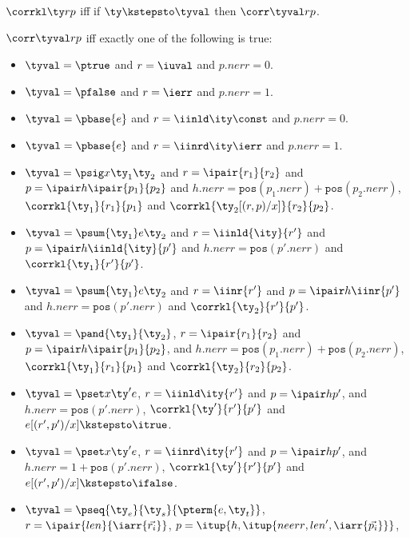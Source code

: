 \begin{definition}
$\corrkl \ty r p$ iff if $\ty \kstepsto \tyval$ then $\corr \tyval r p$.
\end{definition}

\begin{definition}
$\corr \tyval r p$ iff exactly one of the following is true:
  \begin{itemize}
  \item $\tyval = \ptrue$ and $r = \iuval$ and $p.{nerr} = 0$.
  \item $\tyval = \pfalse$ and $r = \ierr$ and $p.{nerr} = 1$.
  \item $\tyval = \pbase{e}$ and $r = \iinld \ity \const$ and $p.{nerr} = 0$.
  \item $\tyval = \pbase{e}$ and $r = \iinrd \ity \ierr$ and $p.{nerr} = 1$.
  \item $\tyval = \psig x {\ty_1} {\ty_2}$ and $r =\ipair {r_1} {r_2}$ and $p =
    \ipair h {\ipair {p_1} {p_2}}$ 
    and $h.{nerr} = \mathtt{pos}(p_1.{nerr}) + \mathtt{pos}(p_2.{nerr})$, $\corrkl
    {\ty_1} {r_1} {p_1}$ and $\corrkl {\ty_2[(r,p)/x]} {r_2} {p_2}$.
  \item $\tyval = \psum {\ty_1} e {\ty_2}$ and $r =\iinld {\ity}{r'}$
    and $p = \ipair h {\iinld {\ity}{p'}}$
    and $h.{nerr} = \mathtt{pos}(p'.{nerr})$ and $\corrkl
    {\ty_1} {r'} {p'}$.
  \item $\tyval = \psum {\ty_1} e {\ty_2}$ and $r =\iinr {r'}$
    and $p = \ipair h {\iinr {p'}}$
    and $h.{nerr} = \mathtt{pos}(p'.{nerr})$ and $\corrkl
    {\ty_2} {r'} {p'}$.
  \item $\tyval = \pand {\ty_1} {\ty_2}$, $r = \ipair {r_1} {r_2}$ and $p =
    \ipair h {\ipair {p_1}{p_2}}$, 
    and $h.{nerr} = \mathtt{pos}(p_1.{nerr}) + \mathtt{pos}(p_2.{nerr})$, 
    $\corrkl {\ty_1} {r_1} {p_1}$ and $\corrkl {\ty_2} {r_2} {p_2}$.
  \item $\tyval = \pset x {\ty'} e$, $r = \iinld \ity {r'}$ and $p =
    \ipair h {p'}$, 
    and $h.{nerr} = \mathtt{pos}(p'.{nerr})$, $\corrkl {\ty'}{r'}{p'}$
    and $e[(r',p')/x] \kstepsto\itrue$.
  \item $\tyval = \pset x {\ty'} e$, $r = \iinrd \ity {r'}$
    and $p = \ipair h {p'}$,
    and $h.{nerr} = 1 + \mathtt{pos}(p'.{nerr})$,
    $\corrkl {\ty'}{r'}{p'}$ and $e[(r',p')/x] \kstepsto \ifalse$.
  \item $\tyval = \pseq {\ty_e}{\ty_s}{\pterm {e,\ty_t}}$, 
    $r = \ipair {len} {\iarr{\vec {r_i}}}$, $p = \itup{h,\itup{{neerr},{len}',\iarr {\vec {p_i}}}}$,

\end{itemize}
\end{definition}

